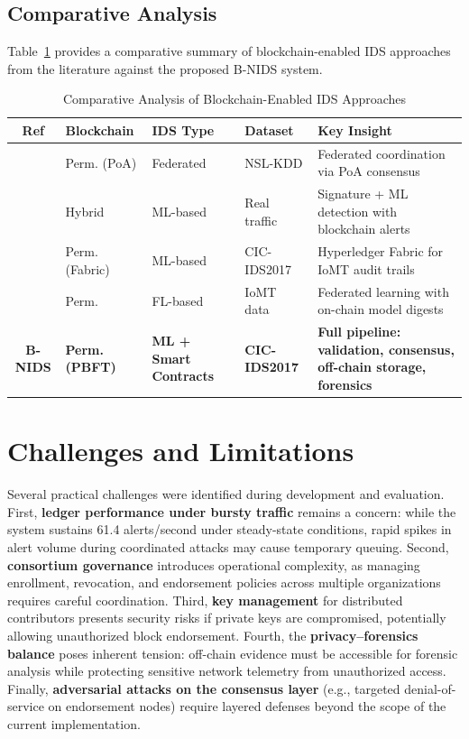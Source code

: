 \documentclass[conference]{IEEEtran}
\begin{document}
\subsection{Comparative Analysis}

Table~\ref{tab:comparison} provides a comparative summary of blockchain-enabled IDS approaches from the literature against the proposed B-NIDS system.

\begin{table}[t]
\caption{Comparative Analysis of Blockchain-Enabled IDS Approaches}
\label{tab:comparison}
\centering
\scriptsize
\renewcommand{\arraystretch}{1.2}
\begin{tabular}{|c|p{1.2cm}|p{1.2cm}|p{1.2cm}|p{2.2cm}|}
\hline
\textbf{Ref} &
\textbf{Blockchain} &
\textbf{IDS Type} &
\textbf{Dataset} &
\textbf{Key Insight} \\
\hline
\cite{zhang2021federated} &
Perm. (PoA) &
Federated &
NSL-KDD &
Federated coordination via PoA consensus \\
\hline
\cite{khonde2022hybrid} &
Hybrid &
ML-based &
Real traffic &
Signature + ML detection with blockchain alerts \\
\hline
\cite{pelekoudas2023prototype} &
Perm. (Fabric) &
ML-based &
CIC-IDS2017 &
Hyperledger Fabric for IoMT audit trails \\
\hline
\cite{begum2024bflids} &
Perm. &
FL-based &
IoMT data &
Federated learning with on-chain model digests \\
\hline
\textbf{B-NIDS} &
\textbf{Perm. (PBFT)} &
\textbf{ML + Smart Contracts} &
\textbf{CIC-IDS2017} &
\textbf{Full pipeline: validation, consensus, off-chain storage, forensics} \\
\hline
\end{tabular}
\end{table}


\section{Challenges and Limitations}

Several practical challenges were identified during development and evaluation. First, \textbf{ledger performance under bursty traffic} remains a concern: while the system sustains 61.4 alerts/second under steady-state conditions, rapid spikes in alert volume during coordinated attacks may cause temporary queuing. Second, \textbf{consortium governance} introduces operational complexity, as managing enrollment, revocation, and endorsement policies across multiple organizations requires careful coordination. Third, \textbf{key management} for distributed contributors presents security risks if private keys are compromised, potentially allowing unauthorized block endorsement. Fourth, the \textbf{privacy--forensics balance} poses inherent tension: off-chain evidence must be accessible for forensic analysis while protecting sensitive network telemetry from unauthorized access. Finally, \textbf{adversarial attacks on the consensus layer} (e.g., targeted denial-of-service on endorsement nodes) require layered defenses beyond the scope of the current implementation.
\end{document}
